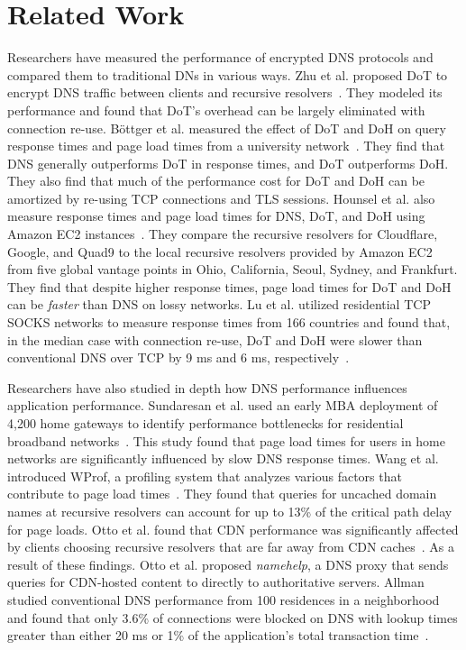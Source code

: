 \section{Related Work}\label{sec:related}
Researchers have measured the performance of encrypted DNS protocols and compared them to traditional DNs in various ways.
Zhu et al. proposed DoT to encrypt DNS traffic between clients and recursive resolvers~\cite{zhu2015connection}.
They modeled its performance and found that DoT's overhead can be largely eliminated with connection re-use.
Böttger et al. measured the effect of DoT and DoH on query response times and page load times from a university network~\cite{boettger2019empirical}.
They find that DNS generally outperforms DoT in response times, and DoT outperforms DoH.
They also find that much of the performance cost for DoT and DoH can be amortized by re-using TCP connections and TLS sessions.
Hounsel et al. also measure response times and page load times for DNS, DoT, and DoH using Amazon EC2 instances~\cite{hounsel2020comparing}.
They compare the recursive resolvers for Cloudflare, Google, and Quad9 to the local recursive resolvers provided by Amazon EC2 from five global vantage points in Ohio, California, Seoul, Sydney, and Frankfurt.
They find that despite higher response times, page load times for DoT and DoH can be \emph{faster} than DNS on lossy networks.
Lu et al. utilized residential TCP SOCKS networks to measure response times from 166 countries and found that, in the median case with connection re-use, DoT and DoH were slower than conventional DNS over TCP by 9 ms and 6 ms, respectively~\cite{lu2019end}.

Researchers have also studied in depth how DNS performance influences application performance.
Sundaresan et al. used an early MBA deployment of 4,200 home gateways to identify performance bottlenecks for residential broadband networks~\cite{sundaresan2013measuring}.
This study found that page load times for users in home networks are significantly influenced by slow DNS response times.
Wang et al. introduced WProf, a profiling system that analyzes various factors that contribute to page load times~\cite{wang2013demystifying}.
They found that queries for uncached domain names at recursive resolvers can account for up to 13\% of the critical path delay for page loads.
Otto et al. found that CDN performance was significantly affected by clients choosing recursive resolvers that are far away from CDN caches~\cite{otto2012content}.
As a result of these findings. Otto et al. proposed \textit{namehelp}, a DNS proxy that sends queries for CDN-hosted content to directly to authoritative servers.
Allman studied conventional DNS performance from 100 residences in a neighborhood and found that only 3.6\% of connections were blocked on DNS with lookup times greater than either 20 ms or 1\% of the application's total transaction time~\cite{allman2020putting}.


